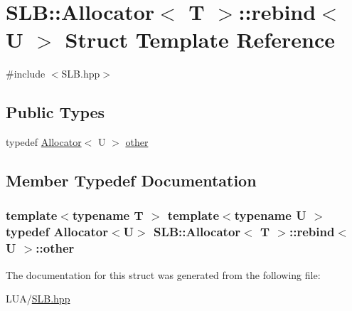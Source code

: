 \hypertarget{structSLB_1_1Allocator_1_1rebind}{}\section{S\+LB\+:\+:Allocator$<$ T $>$\+:\+:rebind$<$ U $>$ Struct Template Reference}
\label{structSLB_1_1Allocator_1_1rebind}


{\ttfamily \#include $<$S\+L\+B.\+hpp$>$}

\subsection*{Public Types}
\begin{DoxyCompactItemize}
\item 
typedef \hyperlink{classSLB_1_1Allocator}{Allocator}$<$ U $>$ \hyperlink{structSLB_1_1Allocator_1_1rebind_a0c9cb0b20f7719f0a4ecbb943a14154b}{other}
\end{DoxyCompactItemize}


\subsection{Member Typedef Documentation}
\subsubsection[{\texorpdfstring{other}{other}}]{\setlength{\rightskip}{0pt plus 5cm}template$<$typename T $>$ template$<$typename U $>$ typedef {\bf Allocator}$<$U$>$ {\bf S\+L\+B\+::\+Allocator}$<$ T $>$\+::{\bf rebind}$<$ U $>$\+::{\bf other}}\hypertarget{structSLB_1_1Allocator_1_1rebind_a0c9cb0b20f7719f0a4ecbb943a14154b}{}\label{structSLB_1_1Allocator_1_1rebind_a0c9cb0b20f7719f0a4ecbb943a14154b}


The documentation for this struct was generated from the following file\+:\begin{DoxyCompactItemize}
\item 
L\+U\+A/\hyperlink{SLB_8hpp}{S\+L\+B.\+hpp}\end{DoxyCompactItemize}
